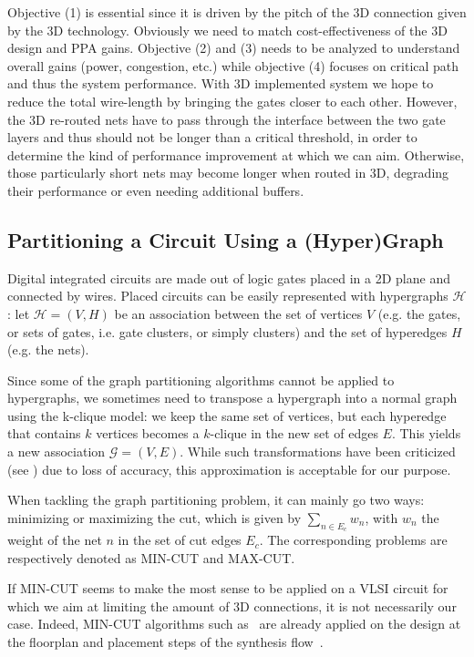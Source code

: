 \documentclass[conference]{IEEEtran}
\begin{document}
Objective (1) is essential since it is driven by the pitch of the 3D connection given by the 3D technology. Obviously we need to match cost-effectiveness of the 3D design and PPA gains. Objective (2) and (3) needs to be analyzed to understand overall gains (power, congestion, etc.) while objective (4) focuses on critical path and thus the system performance. With 3D implemented system we hope to reduce the total wire-length by bringing the gates closer to each other. However, the 3D re-routed nets have to pass through the interface between the two gate layers and thus should not be longer than a critical threshold, in order to determine the kind of performance improvement at which we can aim. 
Otherwise, those particularly short nets may become longer when routed in 3D, degrading their performance or even needing additional buffers.

\subsection{Partitioning a Circuit Using a (Hyper)Graph}
Digital integrated circuits are made out of logic gates placed in a 2D plane and connected by wires. Placed circuits can be easily represented with hypergraphs $\mathcal{H}$: let $\mathcal{H} = (V, H)$ be an association between the set of vertices $V$ (e.g. the gates, or sets of gates, i.e. gate clusters, or simply clusters) and the set of hyperedges $H$ (e.g. the nets). 

Since some of the graph partitioning algorithms cannot be applied to hypergraphs, we sometimes need to transpose a hypergraph into a normal graph using the k-clique model: we keep the same set of vertices, but each hyperedge that contains $k$ vertices becomes a $k$-clique in the new set of edges $E$. This yields a new association $\mathcal{G} = (V, E)$. While such transformations have been criticized (see \cite{IhlerEdmund;WagnerDorothea;Wagner1993}) due to loss of accuracy, this approximation is acceptable for our purpose. %

When tackling the graph partitioning problem, it can mainly go two ways: minimizing or maximizing the cut, which is given by $\sum_{n \in E_c} w_{n}$, with $w_n$ the weight of the net $n$ in the set of cut edges $E_c$. The corresponding problems are respectively denoted as MIN-CUT and MAX-CUT.

If MIN-CUT seems to make the most sense to be applied on a VLSI circuit for which we aim at limiting the amount of 3D connections, it is not necessarily our case. Indeed, MIN-CUT algorithms such as~\cite{Karypis1999, Aykanat2011, Caldwell2000} are already applied on the design at the floorplan and placement steps of the synthesis flow~\cite{KahngAndrewB.Lienig2011}.
\end{document}
